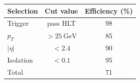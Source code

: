 \begin{tabular}{lcc}
  \toprule
  Selection & Cut value & Efficiency (\unit{\percent}) \\
  \midrule
  Trigger & pass HLT & 98 \\
  $p_T$ & $> \qty{25}{\giga\electronvolt}$ & 85 \\
  $|\eta|$ & $< 2.4$ & 90 \\
  Isolation & $< 0.1$ & 95 \\
  \midrule
  Total & & 71 \\
  \bottomrule
\end{tabular}
